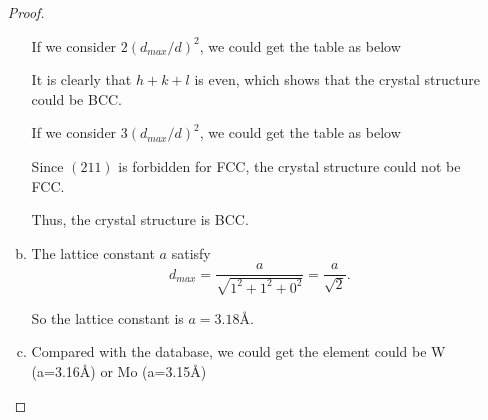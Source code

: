 \documentclass[reqno,a4paper,12pt]{amsart}
\begin{document}
\begin{enumerate}[1.]
\begin{proof}
\begin{enumerate}[(a)]
If we consider $2(d_{max}/d)^2$, we could get the table as below 


It is clearly that $h+k+l$ is even, which shows that the crystal structure could be BCC.

If we consider $3(d_{max}/d)^2$, we could get the table as below 


Since $(211)$ is forbidden for FCC, the crystal structure could not be FCC. 

Thus, the crystal structure is BCC.

\item The lattice constant $a$ satisfy 
\[
	d_{max} = \frac{a}{\sqrt{1^2+1^2+0^2}} = \frac{a}{\sqrt{2}}.
\]

So the lattice constant is $a = 3.18$\AA.

\item Compared with the database, we could get the element could be W (a=3.16\AA) or Mo (a=3.15\AA)
\end{enumerate}

\end{proof}

\medskip

\end{enumerate}
\end{document}
